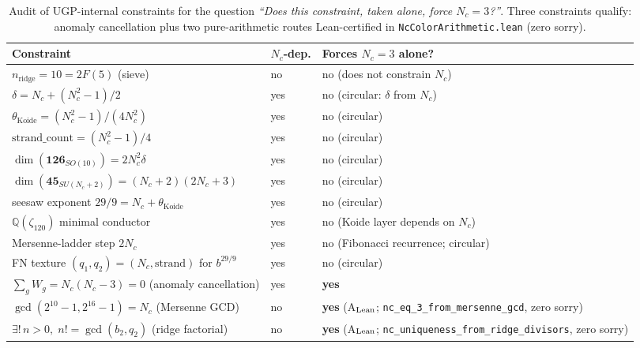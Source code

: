 \documentclass[11pt]{article}
\theoremstyle{remark}
\newcommand{\Nc}{N_c}
\newcommand{\zetaN}[1]{\zeta_{#1}}
\begin{document}
\begin{table}[H]
\centering
\small
\caption{Audit of UGP-internal constraints for the question
\emph{``Does this constraint, taken alone, force $\Nc = 3$?''}.
Three constraints qualify: anomaly cancellation plus two pure-arithmetic routes
Lean-certified in \texttt{NcColorArithmetic.lean} (zero sorry).}
\label{tab:Nc_audit}
\begin{tabular}{@{}ll>{\raggedright\arraybackslash}p{6.5cm}@{}}
\toprule
\textbf{Constraint} & \textbf{$\Nc$-dep.} & \textbf{Forces $\Nc=3$ alone?} \\
\midrule
$n_{\mathrm{ridge}} = 10 = 2F(5)$ (sieve)               & no  & no (does not constrain $\Nc$) \\
$\delta = \Nc + (\Nc^2 - 1)/2$                          & yes & no (circular: $\delta$ from $\Nc$) \\
$\theta_{\mathrm{Koide}} = (\Nc^2-1)/(4\Nc^2)$          & yes & no (circular) \\
$\mathrm{strand\_count} = (\Nc^2-1)/4$                  & yes & no (circular) \\
$\dim(\mathbf{126}_{SO(10)}) = 2\Nc^2\delta$            & yes & no (circular) \\
$\dim(\mathbf{45}_{SU(\Nc{+}2)}) = (\Nc{+}2)(2\Nc{+}3)$ & yes & no (circular) \\
seesaw exponent $29/9 = \Nc + \theta_{\mathrm{Koide}}$  & yes & no (circular) \\
$\mathbb{Q}(\zetaN{120})$ minimal conductor             & yes & no (Koide layer depends on $\Nc$) \\
Mersenne-ladder step $2\Nc$                             & yes & no (Fibonacci recurrence; circular) \\
FN texture $(q_1, q_2) = (\Nc, \mathrm{strand})$ for $b^{29/9}$ & yes & no (circular) \\
\midrule
$\sum_g W_g = \Nc(\Nc - 3) = 0$ (anomaly cancellation)  & yes & \textbf{yes} \\
$\gcd(2^{10}-1,2^{16}-1) = \Nc$ (Mersenne GCD)         & no  & \textbf{yes} (A$_{\rm Lean}$; \texttt{nc\_eq\_3\_from\_mersenne\_gcd}, zero sorry) \\
$\exists!\,n>0,\;n! = \gcd(b_2,q_2)$ (ridge factorial) & no  & \textbf{yes} (A$_{\rm Lean}$; \texttt{nc\_uniqueness\_from\_ridge\_divisors}, zero sorry) \\
\bottomrule
\end{tabular}
\end{table}
\end{document}
